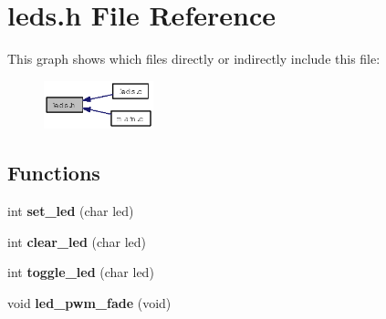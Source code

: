 \section{leds.h File Reference}
\label{leds_8h}


This graph shows which files directly or indirectly include this file:\begin{figure}[H]
\begin{center}
\leavevmode
\includegraphics[width=90pt]{leds_8h__dep__incl}
\end{center}
\end{figure}
\subsection*{Functions}
\begin{CompactItemize}
\item 
int {\bf set\_\-led} (char led)
\item 
int {\bf clear\_\-led} (char led)
\item 
int {\bf toggle\_\-led} (char led)
\item 
void {\bf led\_\-pwm\_\-fade} (void)
\end{CompactItemize}
